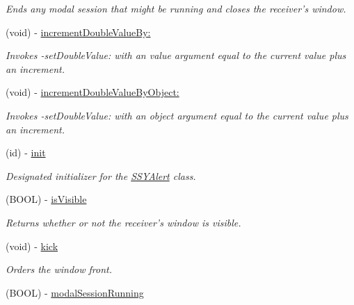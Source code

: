 \begin{CompactItemize}
\begin{CompactList}\small\item\em Ends any modal session that might be running and closes the receiver's window. \item\end{CompactList}\item 
(void) - \hyperlink{interface_s_s_y_alert_d63151a8a976c69f243c119472ee908b}{incrementDoubleValueBy:}
\begin{CompactList}\small\item\em Invokes -setDoubleValue: with an value argument equal to the current value plus an increment. \item\end{CompactList}\item 
(void) - \hyperlink{interface_s_s_y_alert_31ac913c7a345fe1decb48da5b0fdf03}{incrementDoubleValueByObject:}
\begin{CompactList}\small\item\em Invokes -setDoubleValue: with an object argument equal to the current value plus an increment. \item\end{CompactList}\item 
(id) - \hyperlink{interface_s_s_y_alert_e007c72529e2e0dc031572c278a0c331}{init}
\begin{CompactList}\small\item\em Designated initializer for the \hyperlink{interface_s_s_y_alert}{SSYAlert} class. \item\end{CompactList}\item 
\hypertarget{interface_s_s_y_alert_b2124fa025ad7c1f76bfaa6ff441fba5}{
(BOOL) - \hyperlink{interface_s_s_y_alert_b2124fa025ad7c1f76bfaa6ff441fba5}{isVisible}}
\label{interface_s_s_y_alert_b2124fa025ad7c1f76bfaa6ff441fba5}

\begin{CompactList}\small\item\em Returns whether or not the receiver's window is visible. \item\end{CompactList}\item 
(void) - \hyperlink{interface_s_s_y_alert_e61cd5f059bc63c651854ad1f12e4bf0}{kick}
\begin{CompactList}\small\item\em Orders the window front. \item\end{CompactList}\item 
\hypertarget{interface_s_s_y_alert_7a8fbbc84a4ed527df3b08dc20ca5247}{
(BOOL) - \hyperlink{interface_s_s_y_alert_7a8fbbc84a4ed527df3b08dc20ca5247}{modalSessionRunning}}
\label{interface_s_s_y_alert_7a8fbbc84a4ed527df3b08dc20ca5247}


\end{CompactItemize}
